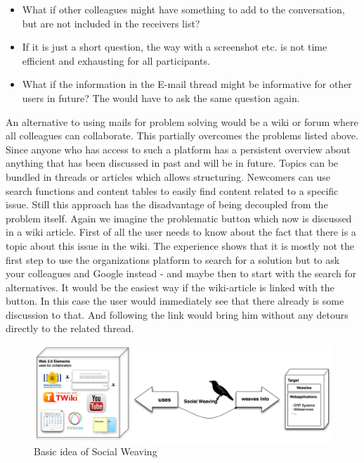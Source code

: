 \begin{itemize}
\item What if other colleagues might have something to add to the conversation, but are not included in the receivers list? 

\item If it is just a short question, the way with a screenshot etc. is not time efficient and exhausting for all participants. 

\item What if the information in the E-mail thread might be informative for other users in future? The would have to ask the same question again. 

\end{itemize}

An alternative to using mails for problem solving would be a wiki or forum where all colleagues can collaborate. This partially overcomes the problems listed above. Since anyone who has access to such a platform has a persistent overview about anything that has been discussed in past and will be in future. Topics can be bundled in threads or articles which allows structuring. Newcomers can use search functions and content tables to easily  find content related to a specific issue. 
Still this approach has the disadvantage of being decoupled from the problem itself. Again we imagine the problematic button which now is discussed in a wiki article. First of all the user needs to know about the fact that there is a topic about this issue in the wiki. The experience shows that it is mostly not the first step to use the organizations platform to search for a solution but to ask your colleagues and Google instead - and maybe then to start with the search for alternatives.  It would be the easiest way if the wiki-article is linked with the button. In this case the user would immediately see that there already is some discussion to that. And following the link would bring him without any detours directly to the related thread.  

\begin{figure}\centering
		\includegraphics[width=13cm]{images/idea-social-weaving.png}
		\caption{Basic idea of Social Weaving}
		\label{idead-social-weaving}
\end{figure} 


